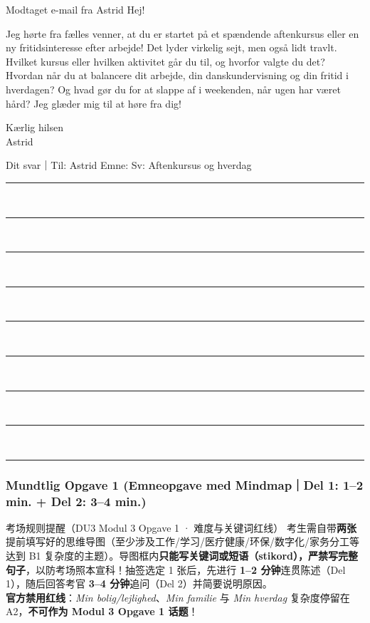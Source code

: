 \begin{emailbox}{Modtaget e-mail fra Astrid}
Hej!

Jeg hørte fra fælles venner, at du er startet på et spændende aftenkursus eller en ny fritidsinteresse efter arbejde! Det lyder virkelig sejt, men også lidt travlt. Hvilket kursus eller hvilken aktivitet går du til, og hvorfor valgte du det? Hvordan når du at balancere dit arbejde, din danskundervisning og din fritid i hverdagen? Og hvad gør du for at slappe af i weekenden, når ugen har været hård? Jeg glæder mig til at høre fra dig!

Kærlig hilsen\\
Astrid
\end{emailbox}

\begin{emailbox}{Dit svar｜Til: Astrid \qquad Emne: Sv: Aftenkursus og hverdag}
\vspace{0.3em}
\rule{\linewidth}{0.4pt}\\[0.55em]
\rule{\linewidth}{0.4pt}\\[0.55em]
\rule{\linewidth}{0.4pt}\\[0.55em]
\rule{\linewidth}{0.4pt}\\[0.55em]
\rule{\linewidth}{0.4pt}\\[0.55em]
\rule{\linewidth}{0.4pt}\\[0.55em]
\rule{\linewidth}{0.4pt}\\[0.55em]
\rule{\linewidth}{0.4pt}\\[0.55em]
\rule{\linewidth}{0.4pt}
\end{emailbox}


\subsubsection*{Mundtlig Opgave 1 (Emneopgave med Mindmap｜Del 1: 1--2 min. + Del 2: 3--4 min.)}

\begin{tipbox}{考场规则提醒（DU3 Modul 3 Opgave 1 · 难度与关键词红线）}
\small
考生需自带\textbf{两张}提前填写好的思维导图（至少涉及工作/学习/医疗健康/环保/数字化/家务分工等达到 B1 复杂度的主题）。导图框内\textbf{只能写关键词或短语（stikord），严禁写完整句子}，以防考场照本宣科！抽签选定 1 张后，先进行 \textbf{1--2 分钟}连贯陈述（Del 1），随后回答考官 \textbf{3--4 分钟}追问（Del 2）并简要说明原因。\\
\textbf{官方禁用红线}：\textit{Min bolig/lejlighed}、\textit{Min familie} 与 \textit{Min hverdag} 复杂度停留在 A2，\textbf{不可作为 Modul 3 Opgave 1 话题}！
\end{tipbox}

